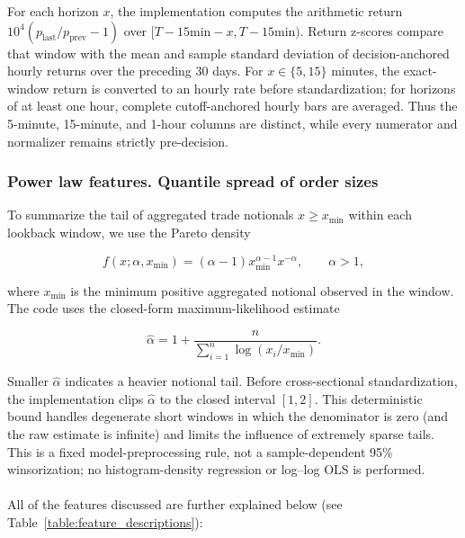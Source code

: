 \documentclass{ieeeaccess}
\begin{document}
For each horizon $x$, the implementation computes the arithmetic return $10^4(p_{\mathrm{last}}/p_{\mathrm{prev}}-1)$ over $[T-15\text{min}-x,T-15\text{min})$. Return z-scores compare that window with the mean and sample standard deviation of decision-anchored hourly returns over the preceding 30 days. For $x\in\{5,15\}$ minutes, the exact-window return is converted to an hourly rate before standardization; for horizons of at least one hour, complete cutoff-anchored hourly bars are averaged. Thus the 5-minute, 15-minute, and 1-hour columns are distinct, while every numerator and normalizer remains strictly pre-decision.

\subsubsection{Power law features. Quantile spread of order sizes}

To summarize the tail of aggregated trade notionals $x\geq x_{\min}$ within each lookback window, we use the Pareto density

\begin{equation}
    f(x;\alpha,x_{\min})=(\alpha-1)x_{\min}^{\alpha-1}x^{-\alpha}, \qquad \alpha>1,
    \label{eq:powerlaw_pdf}
\end{equation}

where $x_{\min}$ is the minimum positive aggregated notional observed in the window. The code uses the closed-form maximum-likelihood estimate

\begin{equation}
    \hat{\alpha}=1+\frac{n}{\sum_{i=1}^{n}\log(x_i/x_{\min})}.
    \label{eq:powerlaw_ols}
\end{equation}

Smaller $\hat{\alpha}$ indicates a heavier notional tail. Before cross-sectional standardization, the implementation clips $\hat{\alpha}$ to the closed interval $[1,2]$. This deterministic bound handles degenerate short windows in which the denominator is zero (and the raw estimate is infinite) and limits the influence of extremely sparse tails. This is a fixed model-preprocessing rule, not a sample-dependent 95\% winsorization; no histogram-density regression or log--log OLS is performed.
\\ \\
All of the features discussed are further explained below (see Table~\ref{table:feature_descriptions}):
\end{document}
